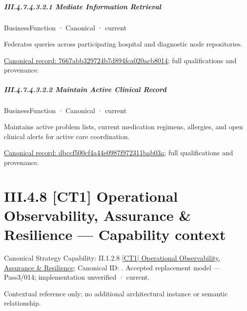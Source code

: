 \subparagraph*{III.4.7.4.3.2.1 Mediate Information Retrieval}
\label{navigation:III.4.7.4.3.2.1}

\label{element:7667abb329724b7d894fca020acb8014}
{\small BusinessFunction · Canonical · current}\par

Federates queries across participating hospital and diagnostic node repositories.


{\footnotesize \href{../../../../continuum/business/business-function/7667abb329724b7d894fca020acb8014.md}{Canonical record: 7667abb329724b7d894fca020acb8014}; full qualifications and provenance.}\par
\subparagraph*{III.4.7.4.3.2.2 Maintain Active Clinical Record}
\label{navigation:III.4.7.4.3.2.2}

\label{element:dbccf500cf4a44e0987f972311bab03a}
{\small BusinessFunction · Canonical · current}\par

Maintains active problem lists, current medication regimens, allergies, and open clinical alerts for active care coordination.


{\footnotesize \href{../../../../continuum/business/business-function/dbccf500cf4a44e0987f972311bab03a.md}{Canonical record: dbccf500cf4a44e0987f972311bab03a}; full qualifications and provenance.}\par
\section*{III.4.8 [CT1] Operational Observability, Assurance \& Resilience — Capability context}
\label{navigation:III.4.8}

{\small Canonical Strategy Capability: II.1.2.8 \hyperref[element:209359b883df42379e7b1c44e65437d8]{[CT1] Operational Observability, Assurance \& Resilience}; Canonical ID: \texttt{}. Accepted replacement model — Pass3/014; implementation unverified · current.}\par
Contextual reference only; no additional architectural instance or semantic relationship.\par
